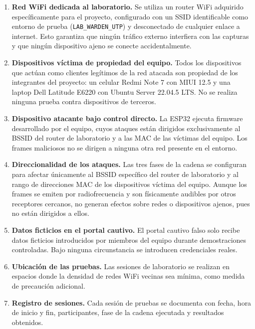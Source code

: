 \documentclass[11pt,a4paper]{article}
\begin{document}
\begin{enumerate}
  \item \textbf{Red WiFi dedicada al laboratorio.} Se utiliza un router WiFi
    adquirido específicamente para el proyecto, configurado con un SSID
    identificable como entorno de prueba (\texttt{LAB\_WARDEN\_UTP}) y
    desconectado de cualquier enlace a internet. Esto garantiza que ningún
    tráfico externo interfiera con las capturas y que ningún dispositivo
    ajeno se conecte accidentalmente.
  \item \textbf{Dispositivos víctima de propiedad del equipo.} Todos los
    dispositivos que actúan como clientes legítimos de la red atacada son
    propiedad de los integrantes del proyecto: un celular Redmi Note 7 con
    MIUI 12.5 y una laptop Dell Latitude E6220 con Ubuntu Server 22.04.5
    LTS. No se realiza ninguna prueba contra dispositivos de terceros.
  \item \textbf{Dispositivo atacante bajo control directo.} La ESP32 ejecuta
    firmware desarrollado por el equipo, cuyos ataques están dirigidos
    exclusivamente al BSSID del router de laboratorio y a las MAC de las
    víctimas del equipo. Los frames maliciosos no se dirigen a ninguna otra
    red presente en el entorno.
  \item \textbf{Direccionalidad de los ataques.} Las tres fases de la cadena
    se configuran para afectar únicamente al BSSID específico del router de
    laboratorio y al rango de direcciones MAC de los dispositivos víctima
    del equipo. Aunque los frames se emiten por radiofrecuencia y son
    físicamente audibles por otros receptores cercanos, no generan efectos
    sobre redes o dispositivos ajenos, pues no están dirigidos a ellos.
  \item \textbf{Datos ficticios en el portal cautivo.} El portal cautivo
    falso solo recibe datos ficticios introducidos por miembros del equipo
    durante demostraciones controladas. Bajo ninguna circunstancia se
    introducen credenciales reales.
  \item \textbf{Ubicación de las pruebas.} Las sesiones de laboratorio se
    realizan en espacios donde la densidad de redes WiFi vecinas sea mínima,
    como medida de precaución adicional.
  \item \textbf{Registro de sesiones.} Cada sesión de pruebas se documenta
    con fecha, hora de inicio y fin, participantes, fase de la cadena
    ejecutada y resultados obtenidos.
\end{enumerate}
\end{document}
